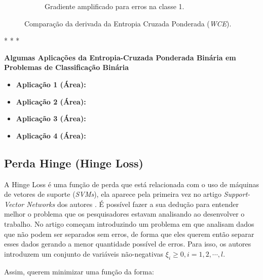 \begin{figure}[h!]
\begin{subfigure}[b]{0.48\textwidth}
        \caption{Gradiente amplificado para erros na classe 1.}
        \label{fig:wce-derivada-alpha1}
    \end{subfigure}
    
    \caption{Comparação da derivada da Entropia Cruzada Ponderada (\textit{WCE}).}
    \label{fig:binary-weighted-cross-entropy-derivada-comparacao}
\end{figure}

\medskip
\begin{center}
 * * *
\end{center}
\medskip

\textbf{Algumas Aplicações da Entropia-Cruzada Ponderada Binária em Problemas de Classificação Binária}

\begin{itemize}
    \item \textbf{Aplicação 1 (Área):}
    \item \textbf{Aplicação 2 (Área):}
    \item \textbf{Aplicação 3 (Área):}
    \item \textbf{Aplicação 4 (Área):}
\end{itemize}

\subsection{Perda Hinge (Hinge Loss)}

A Hinge Loss é uma função de perda que está relacionada com o uso de máquinas de vetores de suporte (\textit{SVMs}), ela aparece pela primeira vez no artigo \textit{Support-Vector Networks} dos autores \textcite{HingeLoss}. É possível fazer a sua dedução para entender melhor o problema que os pesquisadores estavam analisando ao desenvolver o trabalho. No artigo \textcite{HingeLoss} começam introduzindo um problema em que analisam dados que não podem ser separados sem erros, de forma que eles querem então separar esses dados gerando a menor quantidade possível de erros. Para isso, os autores introduzem um conjunto de variáveis não-negativas $\xi_i \ge 0, i = 1, 2, \cdots, l$. 

Assim, \textcite{HingeLoss} querem minimizar uma função da forma:

